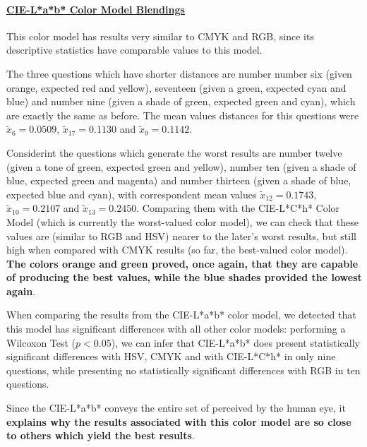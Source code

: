 \paragraph{\ul{CIE-L*a*b* Color Model Blendings}} \par
\label{par:lchcolormodel}
%
This color model has results very similar to CMYK and RGB, since its descriptive statistics have comparable values to this model. \par
%
The three questions which have shorter distances are number number six (given orange, expected red and yellow), seventeen (given a green, expected cyan and blue) and number nine (given a shade
of green, expected green and cyan), which are exactly the same as before. The mean values distances for this questions were $\tilde{x}_{6} = 0.0509$, $\tilde{x}_{17} = 0.1130$ and $\tilde{x}_{9} = 0.1142$. \par
%
Considerint the questions which generate the worst results are number twelve (given a tone of green, expected green and yellow), number ten (given a shade of blue, expected green and magenta) and number thirteen
(given a shade of blue, expected blue and cyan), with correspondent mean values $\tilde{x}_{12} = 0.1743$, $\tilde{x}_{10} = 0.2107$ and $\tilde{x}_{13} = 0.2450$. Comparing them with the CIE-L*C*h* Color Model
(which is currently the worst-valued color model), we can check that these values are (similar to RGB and HSV) nearer to the later's worst results, but still high when compared with CMYK results (so far, the
best-valued color model). \textbf{The colors orange and green proved, once again, that they are capable of producing the best values, while the blue shades provided the lowest again}. \par
%
When comparing the results from the CIE-L*a*b* color model, we detected that this model has significant differences with all other color models: performing a Wilcoxon Test ($p < 0.05$), we can infer that
CIE-L*a*b* does present statistically significant differences with HSV, CMYK and with CIE-L*C*h* in only nine questions, while presenting no statistically significant differences with RGB
in ten questions. \par
%
Since the CIE-L*a*b* conveys the entire set of perceived by the human eye, it \textbf{explains why the results associated with this color model are so close to others which yield the best results}.
%
